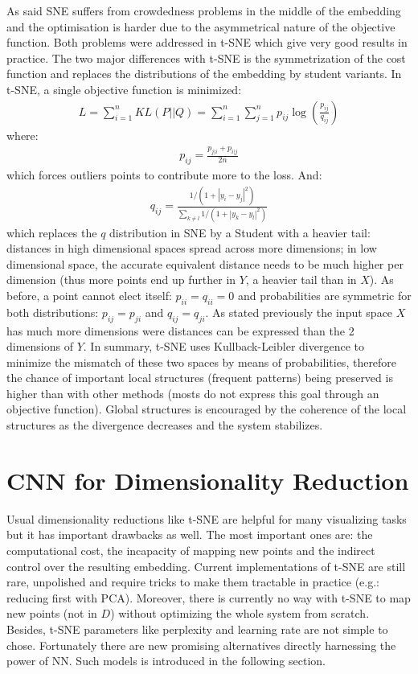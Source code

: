 \documentclass[a4paper,12pt]{report}
\newcommand{\eg}{e.g.}
\begin{document}
As said SNE suffers from crowdedness problems in the middle of the embedding and the optimisation is harder due to the asymmetrical nature of the objective function.
Both problems were addressed in t-SNE which give very good results in practice.
The two major differences with t-SNE is the symmetrization of the cost function and replaces the distributions of the embedding by student variants.
In t-SNE, a single objective function is minimized:
\begin{eqnarray}
    L = \sum_{i=1}^n KL(P || Q) = \sum_{i=1}^n \sum_{j=1}^n p_{ij} \log\left(\frac{p_{ij}}{q_{ij}}\right)
\end{eqnarray}
where:
\begin{eqnarray}
    p_{ij} = \frac{p_{j|i} + p_{i|j}}{2 n}
\end{eqnarray}
which forces outliers points to contribute more to the loss.
And:
\begin{eqnarray}
    q_{ij} = \frac{1 / (1 + |y_i - y_j|^2)}{\sum_{k \not = l} 1/(1 + |y_k - y_l|^2)}
\end{eqnarray}
which replaces the $q$ distribution in SNE by a Student with a heavier tail: distances in high dimensional spaces spread across more dimensions; in low dimensional space, the accurate equivalent distance needs to be much higher per dimension (thus more points end up further in $Y$, a heavier tail than in $X$).
As before, a point cannot elect itself: $p_{ii} = q_{ii} = 0$ and probabilities are symmetric for both distributions: $p_{ij} = p_{ji}$ and $q_{ij} = q_{ji}$.
As stated previously the input space $X$ has much more dimensions were distances can be expressed than the 2 dimensions of $Y$.
In summary, t-SNE uses Kullback-Leibler divergence to minimize the mismatch of these two spaces by means of probabilities, therefore the chance of important local structures (frequent patterns) being preserved is higher than with other methods (mosts do not express this goal through an objective function).
Global structures is encouraged by the coherence of the local structures as the divergence decreases and the system stabilizes.

\section{CNN for Dimensionality Reduction}
Usual dimensionality reductions like t-SNE are helpful for many visualizing tasks but it has important drawbacks as well.
The most important ones are: the computational cost, the incapacity of mapping new points and the indirect control over the resulting embedding.
Current implementations of t-SNE are still rare, unpolished and require tricks to make them tractable in practice (\eg: reducing first with PCA).
Moreover, there is currently no way with t-SNE to map new points (not in $D$) without optimizing the whole system from scratch.
Besides, t-SNE parameters like perplexity and learning rate are not simple to chose.
Fortunately there are new promising alternatives directly harnessing the power of NN.
Such models is introduced in the following section.
\end{document}
